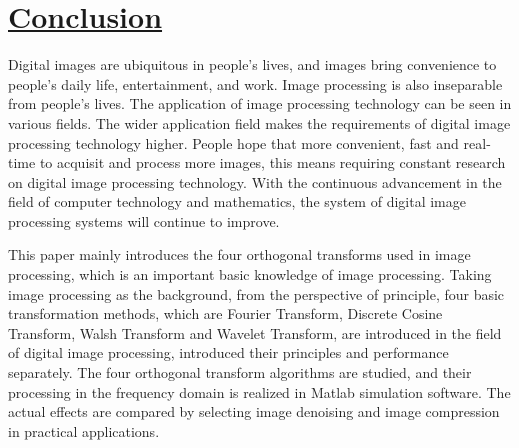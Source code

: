 \chapter{\protect\hyperlink{:}{Conclusion}}
\thispagestyle{fancy} %
Digital images are ubiquitous in people's lives, and images bring convenience to people's daily life, entertainment, and work. Image processing is also inseparable from people's lives. The application of image processing technology can be seen in various fields. The wider application field makes the requirements of digital image processing technology higher. People hope that more convenient, fast and real-time to acquisit and process more images, this means requiring constant research on digital image processing technology. With the continuous advancement in the field of computer technology and mathematics, the system of digital image processing systems will continue to improve.

This paper mainly introduces the four orthogonal transforms used in image processing, which is an important basic knowledge of image processing. Taking image processing as the background, from the perspective of principle, four basic transformation methods, which are Fourier Transform, Discrete Cosine Transform, Walsh Transform and Wavelet Transform, are introduced in the field of digital image processing, introduced their principles and performance separately. The four orthogonal transform algorithms are studied, and their processing in the frequency domain is realized in Matlab simulation software. The actual effects are compared by selecting image denoising and image compression in practical applications.

